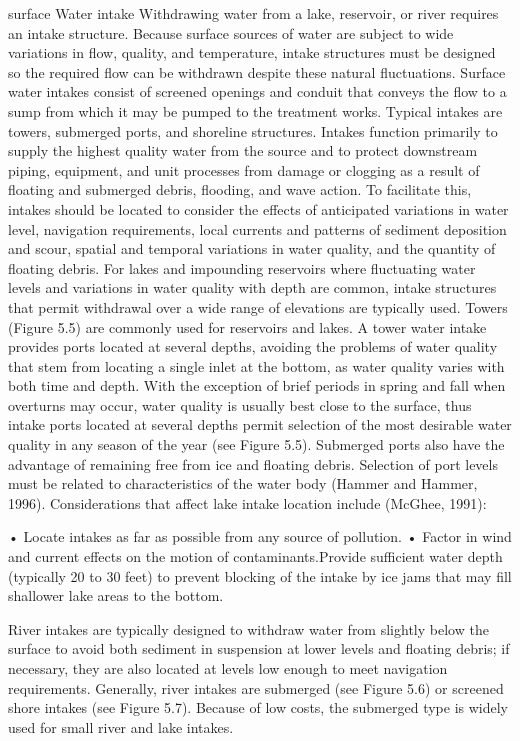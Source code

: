 \documentclass{article}
\begin{document}
surface Water intake Withdrawing water from a lake, reservoir, or river
requires an intake structure. Because surface sources of water are
subject to wide variations in flow, quality, and temperature, intake
structures must be designed so the required flow can be withdrawn
despite these natural fluctuations. Surface water intakes consist of
screened openings and conduit that conveys the flow to a sump from which
it may be pumped to the treatment works. Typical intakes are towers,
submerged ports, and shoreline structures. Intakes function primarily to
supply the highest quality water from the source and to protect
downstream piping, equipment, and unit processes from damage or clogging
as a result of floating and submerged debris, flooding, and wave action.
To facilitate this, intakes should be located to consider the effects of
anticipated variations in water level, navigation requirements, local
currents and patterns of sediment deposition and scour, spatial and
temporal variations in water quality, and the quantity of floating
debris. For lakes and impounding reservoirs where fluctuating water
levels and variations in water quality with depth are common, intake
structures that permit withdrawal over a wide range of elevations are
typically used. Towers (Figure 5.5) are commonly used for reservoirs and
lakes. A tower water intake provides ports located at several depths,
avoiding the problems of water quality that stem from locating a single
inlet at the bottom, as water quality varies with both time and depth.
With the exception of brief periods in spring and fall when overturns
may occur, water quality is usually best close to the surface, thus
intake ports located at several depths permit selection of the most
desirable water quality in any season of the year (see Figure 5.5).
Submerged ports also have the advantage of remaining free from ice and
floating debris. Selection of port levels must be related to
characteristics of the water body (Hammer and Hammer, 1996).
Considerations that affect lake intake location include (McGhee, 1991):

• Locate intakes as far as possible from any source of pollution. •
Factor in wind and current effects on the motion of contaminants.Provide
sufficient water depth (typically 20 to 30 feet) to prevent blocking of
the intake by ice jams that may fill shallower lake areas to the bottom.

River intakes are typically designed to withdraw water from slightly
below the surface to avoid both sediment in suspension at lower levels
and floating debris; if necessary, they are also located at levels low
enough to meet navigation requirements. Generally, river intakes are
submerged (see Figure 5.6) or screened shore intakes (see Figure 5.7).
Because of low costs, the submerged type is widely used for small river
and lake intakes.
\end{document}
